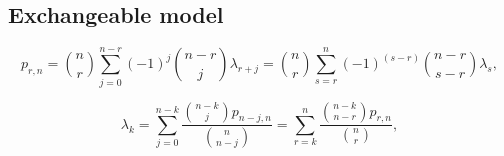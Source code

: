 \documentclass[reqno]{amsart}
\begin{document}
\subsection{Exchangeable model}

\begin{equation}\label{E:1to1}
	p_{r,n}= \binom{n}{r} \sum_{j=0}^{n-r} {(-1)^j} \binom{n-r}{j} \lambda_{r+j} = \binom{n}{r} \sum_{s=r}^{n} {(-1)^(s-r)} \binom{n-r}{s-r} \lambda_{s},
\end{equation}

\begin{equation}\label{E:also1to1}
	\lambda_k = \sum_{j=0}^{n-k} \frac{\binom{n-k}{j} {p_{n-j,n}}}{\binom{n}{n-j}} = \sum_{r=k}^{n} \frac{\binom{n-k}{n-r} {p_{r,n}}}{\binom{n}{r}},
\end{equation}
\end{document}
